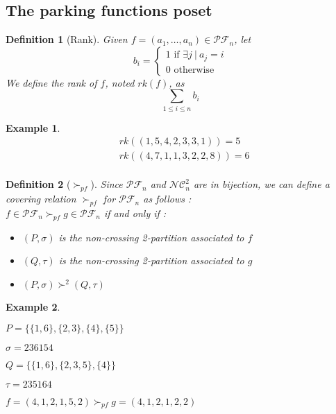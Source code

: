 \documentclass[12pt]{report}
\newtheorem{definition}{Definition}
\newtheorem*{example}{Example}
\begin{document}
\subsection{The parking functions poset}

\begin{definition}[Rank]
    Given $f = (a_1, \ldots, a_n) \in \mathcal{PF}_n$, let
    $$b_i =
    \begin{cases}
        1 \text{ if } \exists j\ |\ a_j = i\\
        0 \text{ otherwise}
    \end{cases} $$
    We define the \emph{rank} of $f$, noted $rk(f)$, as
    $$\sum_{1 \leq i \leq n}{b_i}$$
\end{definition}

\begin{example}
    \begin{align*}
        &rk((1, 5, 4, 2, 3, 3, 1)) = 5\\
        &rk((4, 7, 1, 1, 3, 2 ,2, 8)) = 6\\
    \end{align*}
\end{example}

\begin{definition}[$\succ_{pf}$]
    Since $\mathcal{PF}_n$ and $\mathcal{NC}^2_n$ are
    in bijection, we can define a \emph{covering relation}
    $\succ_{pf}$ for $\mathcal{PF}_n$ as follows :\\
    $f \in \mathcal{PF}_n \succ_{pf} g \in \mathcal{PF}_n$
    if and only if :    
    \begin{itemize}
        \item $(P,\sigma)$ is the non-crossing 2-partition
        associated to $f$
        \item $(Q, \tau)$ is the non-crossing 2-partition
        associated to $g$
        \item $(P, \sigma) \succ^2 (Q, \tau)$
    \end{itemize}
\end{definition}

\begin{example}
    ~\\
    \begin{itemize*}
        \item $P = \{\{1, 6\}, \{2, 3\}, \{4\}, \{5\}\}$\\
        \item $\sigma = 236154$\\
        \item $Q = \{\{1, 6\}, \{2, 3, 5\}, \{4\}\}$\\
        \item $\tau = 235164$\\
        \item $f = (4, 1, 2, 1, 5, 2) \succ_{pf}
            g = (4, 1, 2, 1, 2, 2)$\\
    \end{itemize*}
\end{example}
\end{document}
